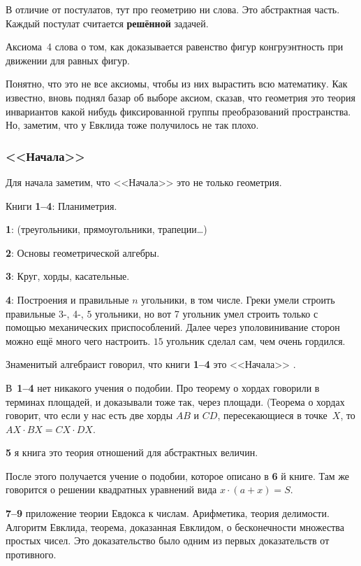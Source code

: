 \documentclass[a4paper,oneside,fleqn,10pt]{article}
\begin{document}
В отличие от постулатов, тут про геометрию ни слова. Это абстрактная
часть.  Каждый постулат считается \textbf{решённой} задачей.

Аксиома~4 слова о том, как доказывается равенство фигур конгруэнтность
при движении для равных фигур.

Понятно, что это не все аксиомы, чтобы из них вырастить всю
математику.  Как известно,  вновь
поднял базар об выборе аксиом, сказав, что геометрия это теория
инвариантов какой нибудь фиксированной группы преобразований
пространства.  Но, заметим, что у Евклида тоже получилось не так
плохо.

\subsubsection{<<Начала>>}

Для начала заметим, что <<Начала>> это не только геометрия.

Книги \textbf{1--4}: Планиметрия.

\textbf{1}: (треугольники, прямоугольники, трапеции\ldots)

\textbf{2}: Основы геометрической алгебры.

\textbf{3}: Круг, хорды, касательные.

\textbf{4}: Построения и правильные $n$ угольники, в том числе.  Греки
умели строить правильные 3-, 4-, $5$ угольники, но вот 7 угольник
 умел строить только с помощью механических
приспособлений.  Далее через уполовинивание сторон можно ещё много
чего настроить.  $15$ угольник  сделал сам, чем очень
гордился.

Знаменитый алгебраист  говорил,
что книги \textbf{1--4} это <<Начала>> .

В~\textbf{1--4} нет никакого учения о подобии. Про теорему о хордах
говорили в терминах площадей, и доказывали тоже так, через площади.
(Теорема о хордах говорит, что если у нас есть две хорды $AB$ и $CD$,
пересекающиеся в точке~$X$, то $AX \cdot BX = CX \cdot DX$.

\textbf{5} я книга это теория отношений  для абстрактных величин.

После этого получается учение о подобии, которое описано в \textbf{6}
й книге.  Там же говорится о решении квадратных уравнений вида $x
\cdot (a + x) = S$.

\textbf{7--9} приложение теории Евдокса к числам. Арифметика, теория
делимости.  Алгоритм Евклида, теорема, доказанная Евклидом, о
бесконечности множества простых чисел.  Это доказательство было одним
из первых доказательств от противного.
\end{document}
